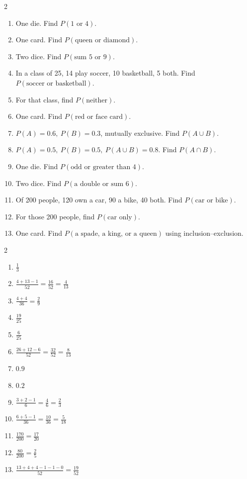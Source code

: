\documentclass[11pt]{article}
\begin{document}
\begin{recapbox}
\begin{multicols}{2}
\small
\begin{enumerate}[leftmargin=*,itemsep=3pt]
  \item One die. Find $P(1\text{ or }4)$.
  \item One card. Find $P(\text{queen or diamond})$.
  \item Two dice. Find $P(\text{sum }5\text{ or }9)$.
  \item In a class of 25, 14 play soccer, 10 basketball, 5 both. Find $P(\text{soccer or basketball})$.
  \item For that class, find $P(\text{neither})$.
  \item One card. Find $P(\text{red or face card})$.
  \item $P(A)=0.6,\ P(B)=0.3$, mutually exclusive. Find $P(A\cup B)$.
  \item $P(A)=0.5,\ P(B)=0.5,\ P(A\cup B)=0.8$. Find $P(A\cap B)$.
  \item One die. Find $P(\text{odd or greater than }4)$.
  \item Two dice. Find $P(\text{a double or sum }6)$.
  \item Of 200 people, 120 own a car, 90 a bike, 40 both. Find $P(\text{car or bike})$.
  \item For those 200 people, find $P(\text{car only})$.
  \item One card. Find $P(\text{a spade, a king, or a queen})$ using inclusion--exclusion.
\end{enumerate}
\end{multicols}
\end{recapbox}

\begin{keybox}
\begin{multicols}{2}
\small
\begin{enumerate}[leftmargin=*,itemsep=3pt]
  \item $\tfrac13$
  \item $\tfrac{4+13-1}{52}=\tfrac{16}{52}=\tfrac{4}{13}$
  \item $\tfrac{4+4}{36}=\tfrac29$
  \item $\tfrac{19}{25}$
  \item $\tfrac{6}{25}$
  \item $\tfrac{26+12-6}{52}=\tfrac{32}{52}=\tfrac{8}{13}$
  \item $0.9$
  \item $0.2$
  \item $\tfrac{3+2-1}{6}=\tfrac46=\tfrac23$
  \item $\tfrac{6+5-1}{36}=\tfrac{10}{36}=\tfrac{5}{18}$
  \item $\tfrac{170}{200}=\tfrac{17}{20}$
  \item $\tfrac{80}{200}=\tfrac25$
  \item $\tfrac{13+4+4-1-1-0}{52}=\tfrac{19}{52}$
\end{enumerate}
\end{multicols}
\end{keybox}
\end{document}
